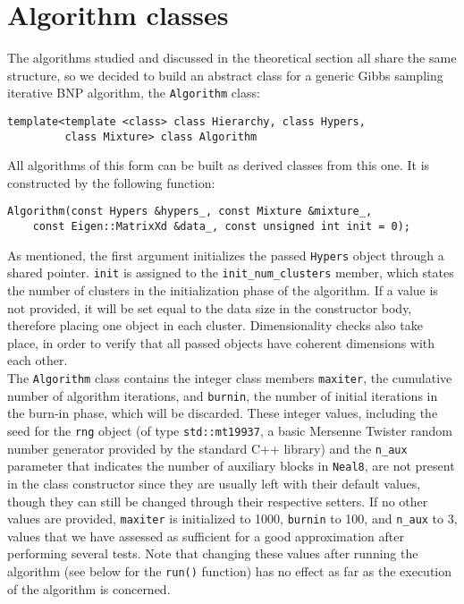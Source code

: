 \section{Algorithm classes}

The algorithms studied and discussed in the theoretical section all share the same structure, so we decided to build an abstract class for a generic Gibbs sampling iterative BNP algorithm, the \verb|Algorithm| class:
\begin{verbatim}
template<template <class> class Hierarchy, class Hypers,
         class Mixture> class Algorithm
\end{verbatim}
All algorithms of this form can be built as derived classes from this one.
It is constructed by the following function:
\begin{verbatim}
Algorithm(const Hypers &hypers_, const Mixture &mixture_,
    const Eigen::MatrixXd &data_, const unsigned int init = 0);
\end{verbatim}
As mentioned, the first argument initializes the passed \verb|Hypers| object through a shared pointer.
\verb|init| is assigned to the \verb|init_num_clusters| member, which states the number of clusters in the initialization phase of the algorithm.
If a value is not provided, it will be set equal to the data size in the constructor body, therefore placing one object in each cluster.
Dimensionality checks also take place, in order to verify that all passed objects have coherent dimensions with each other. \\
The \verb|Algorithm| class contains the integer class members \verb|maxiter|, the cumulative number of algorithm iterations, and \verb|burnin|, the number of initial iterations in the burn-in phase, which will be discarded.
These integer values, including the seed for the \verb|rng| object (of type \verb|std::mt19937|, a basic Mersenne Twister random number generator provided by the standard C++ library) and the \verb|n_aux| parameter that indicates the number of auxiliary blocks in \verb|Neal8|, are not present in the class constructor since they are usually left with their default values, though they can still be changed through their respective setters.
If no other values are provided, \verb|maxiter| is initialized to 1000, \verb|burnin| to 100, and \verb|n_aux| to 3, values that we have assessed as sufficient for a good approximation after performing several tests.
Note that changing these values after running the algorithm (see below for the \verb|run()| function) has no effect as far as the execution of the algorithm is concerned. \\
